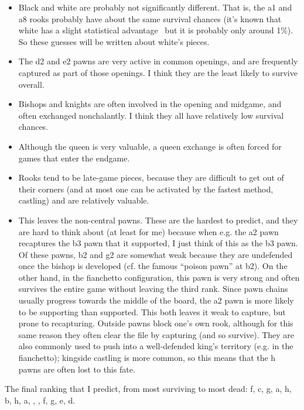 \documentclass[twocolumn]{article}
\begin{document}
\begin{itemize}
\item Black and white are probably not significantly different. That
  is, the a1 and a8 rooks probably have about the same survival
  chances (it's known that white has a slight statistical
  advantage~\cite{chesstego} but it is probably only around 1\%). So
  these guesses will be written about white's pieces.
\item The d2 and e2 pawns are very active in common openings, and
  are frequently captured as part of those openings. I think they
  are the least likely to survive overall.
\item Bishops and knights are often involved in the opening and
  midgame, and often exchanged nonchalantly. I think they all have
  relatively low survival chances.
\item Although the queen is very valuable, a queen exchange is often
  forced for games that enter the endgame.
\item Rooks tend to be late-game pieces, because they are difficult
  to get out of their corners (and at most one can be activated
  by the fastest method, castling) and are relatively valuable.
\item This leaves the non-central pawns. These are the hardest to
  predict, and they are hard to think about (at least for me) because
  when e.g. the a2 pawn recaptures the b3 pawn that it supported, I
  just think of this as the b3 pawn. Of these pawns, b2 and g2 are
  somewhat weak because they are undefended once the bishop is
  developed (cf. the famous ``poison pawn'' at b2). On the other hand,
  in the fianchetto configuration, this pawn is very strong and often
  survives the entire game without leaving the third rank. Since pawn
  chains usually progress towards the middle of the board, the a2 pawn
  is more likely to be supporting than supported. This both leaves it
  weak to capture, but prone to recapturing. Outside pawns block one's
  own rook, although for this same reason they often clear the file by
  capturing (and so survive). They are also commonly used to push into
  a well-defended king's territory (e.g. in the fianchetto); kingside
  castling is more common, so this means that the h pawns are often
  lost to this fate.
\end{itemize}

The final ranking that I predict, from most surviving to most dead:
\pawn f, \pawn c, \pawn g, \pawn a, \pawn h, \pawn b, \rook h, \rook a,
\king, \queen, \bishop f, \knight g, \pawn e, \pawn d.
\end{document}
